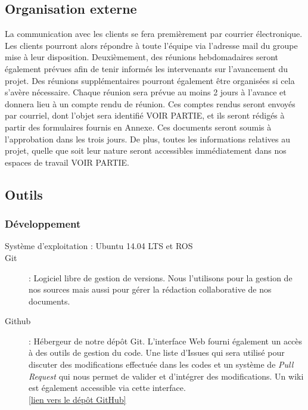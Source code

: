 \documentclass[10pt,a4paper]{article}
\begin{document}
\subsection{Organisation externe}

La communication avec les clients se fera premièrement par courrier électronique. Les clients pourront alors répondre à toute l’équipe via l’adresse mail du groupe mise à leur disposition. Deuxièmement, des réunions hebdomadaires seront également prévues afin de tenir informés les intervenants sur l’avancement du projet. Des réunions supplémentaires pourront également être organisées si cela s’avère nécessaire. Chaque réunion sera prévue au moins 2 jours à l’avance et donnera lieu à un compte rendu de réunion. Ces comptes rendus seront envoyés par courriel, dont l’objet sera identifié VOIR PARTIE, et ils seront rédigés à partir des formulaires fournis en Annexe. Ces documents seront soumis à l’approbation dans les trois jours. De plus, toutes les informations relatives au projet, quelle que soit leur nature seront accessibles immédiatement dans nos espaces de travail VOIR PARTIE.

\subsection{Outils}

\subsubsection{Développement}
\begin{description}
\item [Système d'exploitation : Ubuntu 14.04 LTS et ROS]
\item [Git] : Logiciel libre de gestion de versions. Nous l'utilisons pour la gestion de nos sources mais aussi pour gérer la rédaction collaborative de nos documents.
\item [Github] : Hébergeur de notre dépôt Git. L'interface Web fourni également un accès à des outils de gestion du code. Une liste d'Issues qui sera utilisé pour discuter des modifications effectuée dans les codes et un système de \textit{Pull Request} qui nous permet de valider et d'intégrer des modifications. Un wiki est également accessible via cette interface.\\ \href{https://github.com/Projet-Navigation-UPS}{[lien vers le dépôt GitHub]} 
\end{description}
\end{document}
